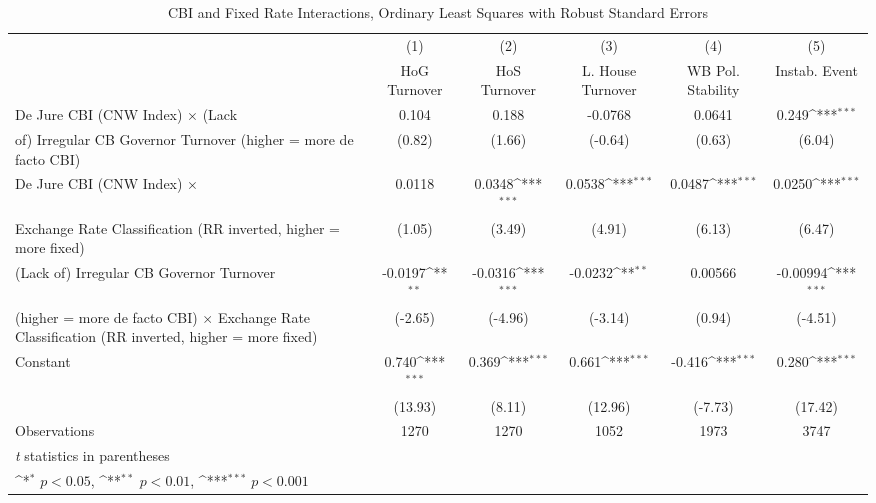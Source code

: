 \begin{table}[htbp]\centering
\def\sym#1{\ifmmode^{#1}\else\(^{#1}\)\fi}
\caption{CBI and Fixed Rate Interactions, Ordinary Least Squares with Robust Standard Errors \label{imultIndOLS}}
\begin{tabular}{l*{5}{c}}
\toprule
                                        &\multicolumn{1}{c}{(1)}&\multicolumn{1}{c}{(2)}&\multicolumn{1}{c}{(3)}&\multicolumn{1}{c}{(4)}&\multicolumn{1}{c}{(5)}\\
                                        &\multicolumn{1}{c}{HoG Turnover}&\multicolumn{1}{c}{HoS Turnover}&\multicolumn{1}{c}{L. House Turnover}&\multicolumn{1}{c}{WB Pol. Stability}&\multicolumn{1}{c}{Instab. Event}\\
\midrule
De Jure CBI (CNW Index) $\times$ (Lack  &    0.104         &    0.188         &  -0.0768         &   0.0641         &    0.249\sym{***}\\
of) Irregular CB Governor Turnover (higher = more de facto CBI)&   (0.82)         &   (1.66)         &  (-0.64)         &   (0.63)         &   (6.04)         \\
\addlinespace
De Jure CBI (CNW Index) $\times$        &   0.0118         &   0.0348\sym{***}&   0.0538\sym{***}&   0.0487\sym{***}&   0.0250\sym{***}\\
Exchange Rate Classification (RR inverted, higher = more fixed)&   (1.05)         &   (3.49)         &   (4.91)         &   (6.13)         &   (6.47)         \\
\addlinespace
(Lack of) Irregular CB Governor Turnover&  -0.0197\sym{**} &  -0.0316\sym{***}&  -0.0232\sym{**} &  0.00566         & -0.00994\sym{***}\\
(higher = more de facto CBI) $\times$ Exchange Rate Classification (RR inverted, higher = more fixed)&  (-2.65)         &  (-4.96)         &  (-3.14)         &   (0.94)         &  (-4.51)         \\
\addlinespace
Constant                                &    0.740\sym{***}&    0.369\sym{***}&    0.661\sym{***}&   -0.416\sym{***}&    0.280\sym{***}\\
                                        &  (13.93)         &   (8.11)         &  (12.96)         &  (-7.73)         &  (17.42)         \\
\midrule
Observations                            &     1270         &     1270         &     1052         &     1973         &     3747         \\
\bottomrule
\multicolumn{6}{l}{\footnotesize \textit{t} statistics in parentheses}\\
\multicolumn{6}{l}{\footnotesize \sym{*} \(p<0.05\), \sym{**} \(p<0.01\), \sym{***} \(p<0.001\)}\\
\end{tabular}
\end{table}
